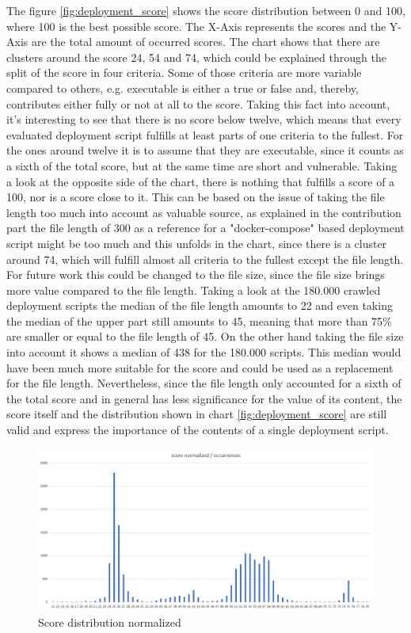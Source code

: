 The figure \ref{fig:deployment_score} shows the score distribution between 0 and 100, where 100 is the best possible score. The X-Axis represents the scores and the Y-Axis are the total amount of occurred scores. The chart shows that there are clusters around the score 24, 54 and 74, which could be explained through the split of the score in four criteria. Some of those criteria are more variable compared to others, e.g. executable is either a true or false and, thereby, contributes either fully or not at all to the score. Taking this fact into account, it's interesting to see that there is no score below twelve, which means that every evaluated deployment script fulfills at least parts of one criteria to the fullest. For the ones around twelve it is to assume that they are executable, since it counts as a sixth of the total score, but at the same time are short and vulnerable. Taking a look at the opposite side of the chart, there is nothing that fulfills a score of a 100, nor is a score close to it. This can be based on the issue of taking the file length too much into account as valuable source, as explained in the contribution part  the file length of 300 as a reference for a "docker-compose" based deployment script might be too much and this unfolds in the chart, since there is a cluster around 74, which will fulfill almost all criteria to the fullest except the file length. For future work this could be changed to the file size, since the file size brings more value compared to the file length. Taking a look at the 180.000 crawled deployment scripts the median of the file length amounts to 22 and even taking the median of the upper part still amounts to 45, meaning that more than 75\% are smaller or equal to the file length of 45. On the other hand taking the file size into account it shows a median of 438 for the 180.000 scripts. This median would have been much more suitable for the score and could be used as a replacement for the file length. Nevertheless, since the file length only accounted for a sixth of the total score and in general has less significance for the value of its content, the score itself and the distribution shown in chart \ref{fig:deployment_score} are still valid and express the importance of the contents of a single deployment script.

\begin{figure}[H]
    \centering
    \includegraphics[scale=0.5]{graphics/deployment_score_normalized.png}
    \caption{Score distribution normalized}
    \label{fig:deployment_score_normalized}
\end{figure}


